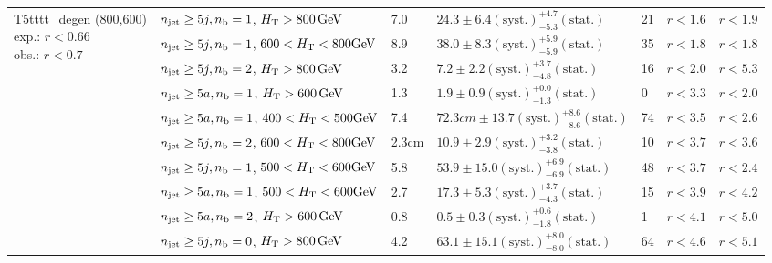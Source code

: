 \begin{table}[h!]
\begin{tabular}{ lllllll }
\multirow{10}{*}{\parbox[t]{2.3cm}{T5tttt\_degen (800,600)\\exp.: $r<0.66$\\obs.: $r<0.7$}}
 & $n_{\mathrm{jet}} \geq5j,n_{\text{b}} =1$, $\mbox{$H_\text{T}$} > 800 \, \mathrm{GeV}$ & 7.0 & $24.3 \pm 6.4 \mathrm{(syst.)} ^{+4.7}_{-5.3} \mathrm{(stat.)}$ & 21 & $r < 1.6$ & $r < 1.9$\\ 
 & $n_{\mathrm{jet}} \geq5j,n_{\text{b}} =1$, $600 < \mbox{$H_\text{T}$} < 800 \mathrm{GeV}$ & 8.9 & $38.0 \pm 8.3 \mathrm{(syst.)} ^{+5.9}_{-5.9} \mathrm{(stat.)}$ & 35 & $r < 1.8$ & $r < 1.8$\\ 
 & $n_{\mathrm{jet}} \geq5j,n_{\text{b}} =2$, $\mbox{$H_\text{T}$} > 800 \, \mathrm{GeV}$ & 3.2 & $7.2 \pm 2.2 \mathrm{(syst.)} ^{+3.7}_{-4.8} \mathrm{(stat.)}$ & 16 & $r < 2.0$ & $r < 5.3$\\ 
 & $n_{\mathrm{jet}} \geq5a,n_{\text{b}} =1$, $\mbox{$H_\text{T}$} > 600 \, \mathrm{GeV}$ & 1.3 & $1.9 \pm 0.9 \mathrm{(syst.)} ^{+0.0}_{-1.3} \mathrm{(stat.)}$ & 0 & $r < 3.3$ & $r < 2.0$\\ 
 & $n_{\mathrm{jet}} \geq5a,n_{\text{b}} =1$, $400 < \mbox{$H_\text{T}$} < 500 \mathrm{GeV}$ & 7.4 & $72.3cm \pm 13.7 \mathrm{(syst.)} ^{+8.6}_{-8.6} \mathrm{(stat.)}$ & 74 & $r < 3.5$ & $r < 2.6$\\ 
 & $n_{\mathrm{jet}} \geq5j,n_{\text{b}} =2$, $600 < \mbox{$H_\text{T}$} < 800 \mathrm{GeV}$ & 2.3cm & $10.9 \pm 2.9 \mathrm{(syst.)} ^{+3.2}_{-3.8} \mathrm{(stat.)}$ & 10 & $r < 3.7$ & $r < 3.6$\\ 
 & $n_{\mathrm{jet}} \geq5j,n_{\text{b}} =1$, $500 < \mbox{$H_\text{T}$} < 600 \mathrm{GeV}$ & 5.8 & $53.9 \pm 15.0 \mathrm{(syst.)} ^{+6.9}_{-6.9} \mathrm{(stat.)}$ & 48 & $r < 3.7$ & $r < 2.4$\\ 
 & $n_{\mathrm{jet}} \geq5a,n_{\text{b}} =1$, $500 < \mbox{$H_\text{T}$} < 600 \mathrm{GeV}$ & 2.7 & $17.3 \pm 5.3 \mathrm{(syst.)} ^{+3.7}_{-4.3} \mathrm{(stat.)}$ & 15 & $r < 3.9$ & $r < 4.2$\\ 
 & $n_{\mathrm{jet}} \geq5a,n_{\text{b}} =2$, $\mbox{$H_\text{T}$} > 600 \, \mathrm{GeV}$ & 0.8 & $0.5 \pm 0.3 \mathrm{(syst.)} ^{+0.6}_{-1.8} \mathrm{(stat.)}$ & 1 & $r < 4.1$ & $r < 5.0$\\ 
 & $n_{\mathrm{jet}} \geq5j,n_{\text{b}} =0$, $\mbox{$H_\text{T}$} > 800 \, \mathrm{GeV}$ & 4.2 & $63.1 \pm 15.1 \mathrm{(syst.)} ^{+8.0}_{-8.0} \mathrm{(stat.)}$ & 64 & $r < 4.6$ & $r < 5.1$\\ \hline
    \hline
  \end{tabular}
\end{table}

